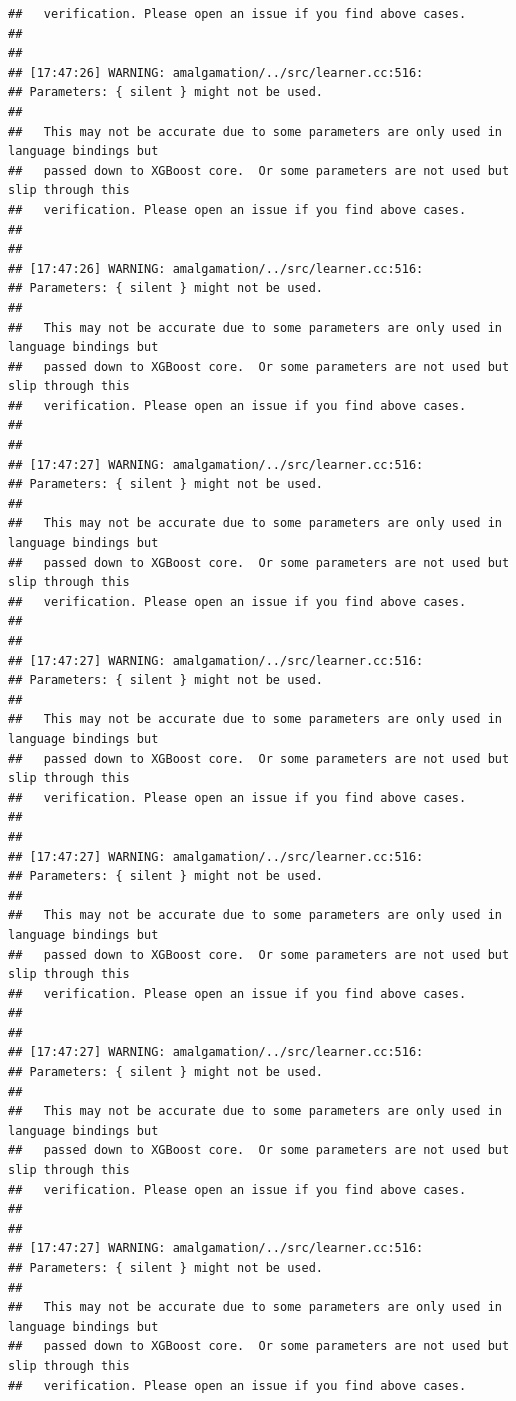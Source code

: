 \documentclass[AMS,STIX2COL]{WileyNJD-v2}\usepackage[]{graphicx}\usepackage[]{color}
\makeatletter
\newenvironment{kframe}{%
 \def\at@end@of@kframe{}%
 \ifinner\ifhmode%
  \def\at@end@of@kframe{\end{minipage}}%
  \begin{minipage}{\columnwidth}%
 \fi\fi%
 \def\FrameCommand##1{\hskip\@totalleftmargin \hskip-\fboxsep
 \colorbox{shadecolor}{##1}\hskip-\fboxsep
     \hskip-\linewidth \hskip-\@totalleftmargin \hskip\columnwidth}%
 \MakeFramed {\advance\hsize-\width
   \@totalleftmargin\z@ \linewidth\hsize
   \@setminipage}}%
 {\par\unskip\endMakeFramed%
 \at@end@of@kframe}
\newenvironment{knitrout}{}{} %
\makeatother
\begin{document}
\begin{knitrout}
\begin{kframe}
\begin{verbatim}
##   verification. Please open an issue if you find above cases.
## 
## 
## [17:47:26] WARNING: amalgamation/../src/learner.cc:516: 
## Parameters: { silent } might not be used.
## 
##   This may not be accurate due to some parameters are only used in language bindings but
##   passed down to XGBoost core.  Or some parameters are not used but slip through this
##   verification. Please open an issue if you find above cases.
## 
## 
## [17:47:26] WARNING: amalgamation/../src/learner.cc:516: 
## Parameters: { silent } might not be used.
## 
##   This may not be accurate due to some parameters are only used in language bindings but
##   passed down to XGBoost core.  Or some parameters are not used but slip through this
##   verification. Please open an issue if you find above cases.
## 
## 
## [17:47:27] WARNING: amalgamation/../src/learner.cc:516: 
## Parameters: { silent } might not be used.
## 
##   This may not be accurate due to some parameters are only used in language bindings but
##   passed down to XGBoost core.  Or some parameters are not used but slip through this
##   verification. Please open an issue if you find above cases.
## 
## 
## [17:47:27] WARNING: amalgamation/../src/learner.cc:516: 
## Parameters: { silent } might not be used.
## 
##   This may not be accurate due to some parameters are only used in language bindings but
##   passed down to XGBoost core.  Or some parameters are not used but slip through this
##   verification. Please open an issue if you find above cases.
## 
## 
## [17:47:27] WARNING: amalgamation/../src/learner.cc:516: 
## Parameters: { silent } might not be used.
## 
##   This may not be accurate due to some parameters are only used in language bindings but
##   passed down to XGBoost core.  Or some parameters are not used but slip through this
##   verification. Please open an issue if you find above cases.
## 
## 
## [17:47:27] WARNING: amalgamation/../src/learner.cc:516: 
## Parameters: { silent } might not be used.
## 
##   This may not be accurate due to some parameters are only used in language bindings but
##   passed down to XGBoost core.  Or some parameters are not used but slip through this
##   verification. Please open an issue if you find above cases.
## 
## 
## [17:47:27] WARNING: amalgamation/../src/learner.cc:516: 
## Parameters: { silent } might not be used.
## 
##   This may not be accurate due to some parameters are only used in language bindings but
##   passed down to XGBoost core.  Or some parameters are not used but slip through this
##   verification. Please open an issue if you find above cases.

\end{verbatim}
\end{kframe}
\end{knitrout}
\end{document}
